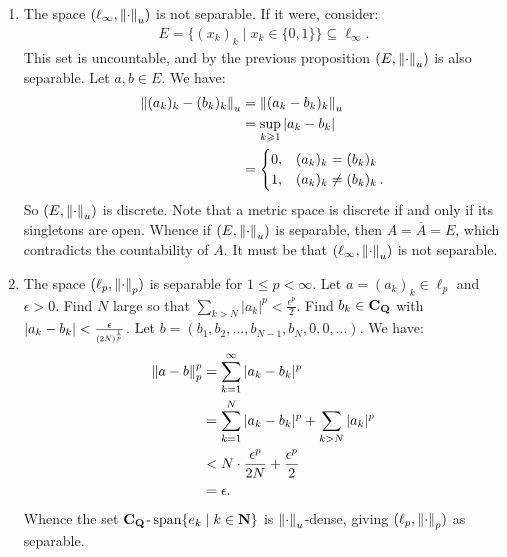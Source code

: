     \begin{example}
        \phantom{a}
        \begin{enumerate}[label = (\arabic*),itemsep=1pt,topsep=3pt]
            \item The space $(\ell_\infty, \lnorm \cdot \rnorm_u)$ is not separable. If it were, consider:
                \begin{equation*}
                \begin{split}
                    E = \{(x_k)_k \mid x_k \in \{0,1\}\} \subseteq \ell_\infty.
                \end{split}
                \end{equation*}
            This set is uncountable, and by the previous proposition $(E, \lnorm \cdot \rnorm_u)$ is also separable. Let $a,b\in E$. We have:
                \begin{equation*}
                \begin{split}
                    \lnorm (a_k)_k - (b_k)_k \rnorm_u 
                    & = \lnorm (a_k - b_k)_k \rnorm_u \\
                    & = \sup_{k \geq 1}|a_k - b_k| \\
                    & = \begin{cases}
                        0, & (a_k)_k = (b_k)_k \\
                        1, & (a_k)_k \neq (b_k)_k \h2.
                    \end{cases}
                \end{split}
                \end{equation*}
            So $(E,\lnorm \cdot \rnorm_u)$ is discrete. Note that a metric space is discrete if and only if its singletons are open. Whence if $(E,\lnorm \cdot \rnorm_u)$ is separable, then $A = \overline{A}  = E$, which contradicts the countability of $A$. It must be that $(\ell_\infty, \lnorm \cdot \rnorm_u)$ is not separable.

            \item The space $(\ell_p, \lnorm \cdot \rnorm_p)$ is separable for $1 \leq p < \infty$. Let $a = (a_k)_k \in \ell_p$ and $\epsilon > 0$. Find $N$ large so that $\sum_{k > N}|a_k|^p < \frac{\epsilon^p}{2}$. Find $b_k \in \bfC_\bfQ$ with $|a_k - b_k| < \frac{\epsilon}{\text{\scalebox{.8}{$(2N)^\frac{1}{p}$}}}$. Let $b = (b_1,b_2,...,b_{N-1},b_N,0,0,...)$. We have:
                \begin{equation*}
                \begin{split}
                    \lnorm a-b \rnorm_p^p 
                    & = \sum_{k = 1}^\infty |a_k - b_k|^p \\
                    & = \sum_{k = 1}^N |a_k - b_k|^p + \sum_{k > N}|a_k|^p \\
                    & < N \cdot \frac{\epsilon^p}{2N} + \frac{\epsilon^p}{2} \\
                    & = \epsilon.
                \end{split}
                \end{equation*}
            Whence the set $\bfC_\bfQ\text{\h1-}\Span\{e_k \mid k \in \bfN\}$ is $\lnorm \cdot \rnorm_u$-dense, giving $(\ell_p,\lnorm \cdot \rnorm_p)$ as separable.


\end{enumerate}
\end{example}
